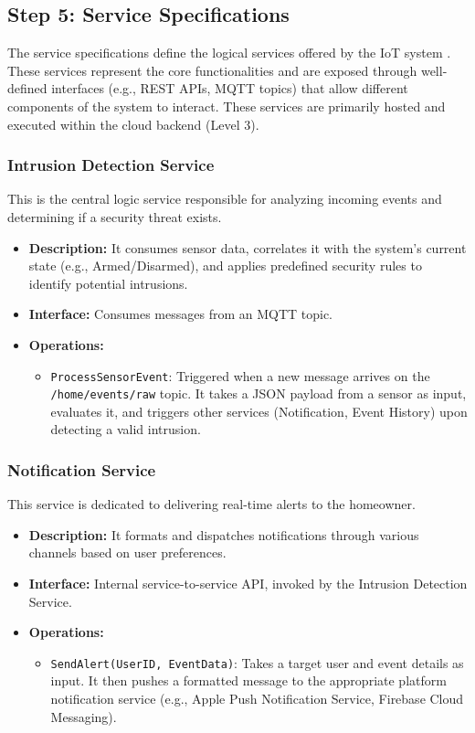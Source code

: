 \documentclass[conference]{IEEEtran}
\begin{document}
\subsection{Step 5: Service Specifications}
The service specifications define the logical services offered by the IoT system \cite{design_implementation_smart_home_IoT_2024}. These services represent the core functionalities and are exposed through well-defined interfaces (e.g., REST APIs, MQTT topics) that allow different components of the system to interact. These services are primarily hosted and executed within the cloud backend (Level 3)\cite{tipirisetty_home_automation_case_study_2025, startertutorials_IoT_methodology, sharma_iot_based_smart_home_automation_2020}.

\subsubsection{Intrusion Detection Service}
This is the central logic service responsible for analyzing incoming events and determining if a security threat exists.
\begin{itemize}
    \item \textbf{Description:} It consumes sensor data, correlates it with the system's current state (e.g., Armed/Disarmed), and applies predefined security rules to identify potential intrusions.
    \item \textbf{Interface:} Consumes messages from an MQTT topic.
    \item \textbf{Operations:}
    \begin{itemize}
        \item \texttt{ProcessSensorEvent}: Triggered when a new message arrives on the \texttt{/home/events/raw} topic. It takes a JSON payload from a sensor as input, evaluates it, and triggers other services (Notification, Event History) upon detecting a valid intrusion.
    \end{itemize}
\end{itemize}

\subsubsection{Notification Service}
This service is dedicated to delivering real-time alerts to the homeowner.
\begin{itemize}
    \item \textbf{Description:} It formats and dispatches notifications through various channels based on user preferences.
    \item \textbf{Interface:} Internal service-to-service API, invoked by the Intrusion Detection Service.
    \item \textbf{Operations:}
    \begin{itemize}
        \item \texttt{SendAlert(UserID, EventData)}: Takes a target user and event details as input. It then pushes a formatted message to the appropriate platform notification service (e.g., Apple Push Notification Service, Firebase Cloud Messaging).
    \end{itemize}
\end{itemize}
\end{document}
